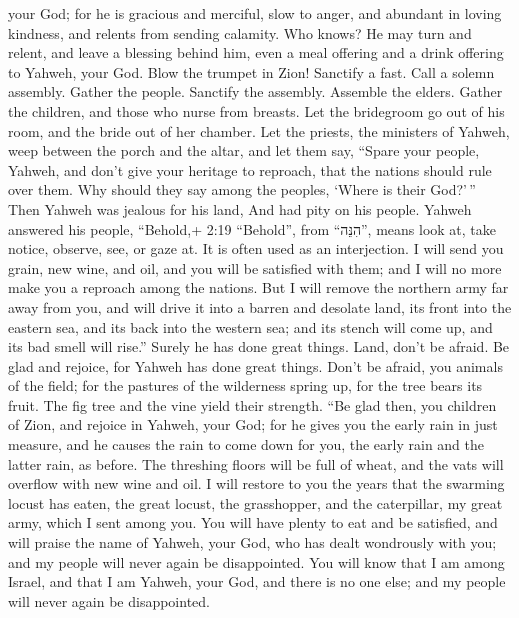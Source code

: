 your God; for he is gracious and merciful, slow to anger, and abundant
in loving kindness, and relents from sending calamity.  Who
knows? He may turn and relent, and leave a blessing behind him, even a
meal offering and a drink offering to Yahweh, your God. 
Blow the trumpet in Zion! Sanctify a fast. Call a solemn assembly.
 Gather the people. Sanctify the assembly. Assemble the
elders. Gather the children, and those who nurse from breasts. Let the
bridegroom go out of his room, and the bride out of her chamber.
 Let the priests, the ministers of Yahweh, weep between the
porch and the altar, and let them say, ``Spare your people, Yahweh, and
don't give your heritage to reproach, that the nations should rule over
them. Why should they say among the peoples, `Where is their God?'\,''
 Then Yahweh was jealous for his land, And had pity on his
people.  Yahweh answered his people, ``Behold,+ 2:19
``Behold'', from ``הִנֵּה'', means look at, take notice, observe, see,
or gaze at. It is often used as an interjection. I will send you grain,
new wine, and oil, and you will be satisfied with them; and I will no
more make you a reproach among the nations.  But I will
remove the northern army far away from you, and will drive it into a
barren and desolate land, its front into the eastern sea, and its back
into the western sea; and its stench will come up, and its bad smell
will rise.'' Surely he has done great things.  Land, don't
be afraid. Be glad and rejoice, for Yahweh has done great things.
 Don't be afraid, you animals of the field; for the
pastures of the wilderness spring up, for the tree bears its fruit. The
fig tree and the vine yield their strength.  ``Be glad
then, you children of Zion, and rejoice in Yahweh, your God; for he
gives you the early rain in just measure, and he causes the rain to come
down for you, the early rain and the latter rain, as before.
 The threshing floors will be full of wheat, and the vats
will overflow with new wine and oil.  I will restore to you
the years that the swarming locust has eaten, the great locust, the
grasshopper, and the caterpillar, my great army, which I sent among you.
 You will have plenty to eat and be satisfied, and will
praise the name of Yahweh, your God, who has dealt wondrously with you;
and my people will never again be disappointed.  You will
know that I am among Israel, and that I am Yahweh, your God, and there
is no one else; and my people will never again be disappointed.
